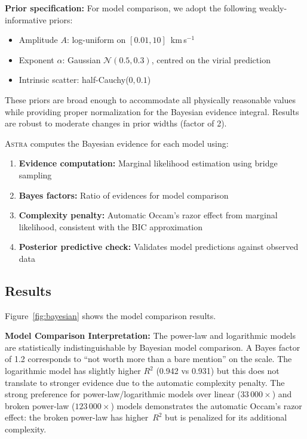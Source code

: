 \documentclass[usenatbib]{rasti}
\newcommand{\astra}{\textsc{Astra}\xspace}
\begin{document}
\textbf{Prior specification:}
For model comparison, we adopt the following weakly-informative priors:
\begin{itemize}
  \item Amplitude $A$: log-uniform on $[0.01, 10]$~km\,s$^{-1}$
  \item Exponent $\alpha$: Gaussian $\mathcal{N}(0.5, 0.3)$, centred on the virial prediction
  \item Intrinsic scatter: half-Cauchy($0, 0.1$)
\end{itemize}
These priors are broad enough to accommodate all physically reasonable values while providing proper normalization for the Bayesian evidence integral.
Results are robust to moderate changes in prior widths (factor of 2).

\astra computes the Bayesian evidence for each model using:
\begin{enumerate}
  \item[(i)] \textbf{Evidence computation:} Marginal likelihood estimation using bridge sampling \citep{MengWong1996}
  \item[(ii)] \textbf{Bayes factors:} Ratio of evidences for model comparison \citep{KassRaftery1995}
  \item[(iii)] \textbf{Complexity penalty:} Automatic Occam's razor effect from marginal likelihood, consistent with the BIC approximation \citep{Schwarz1978}
  \item[(iv)] \textbf{Posterior predictive check:} Validates model predictions against observed data
\end{enumerate}

\subsection{Results}
\label{sec:tc5:results}

Figure~\ref{fig:bayesian} shows the model comparison results.

\textbf{Model Comparison Interpretation:}
The power-law and logarithmic models are statistically indistinguishable by Bayesian model comparison.
A Bayes factor of 1.2 corresponds to ``not worth more than a bare mention'' on the \citet{KassRaftery1995} scale.
The logarithmic model has slightly higher $R^2$ (0.942 vs 0.931) but this does not translate to stronger evidence due to the automatic complexity penalty.
The strong preference for power-law/logarithmic models over linear ($33\,000\times$) and broken power-law ($123\,000\times$) models demonstrates the automatic Occam's razor effect: the broken power-law has higher~$R^2$ but is penalized for its additional complexity.
\end{document}
